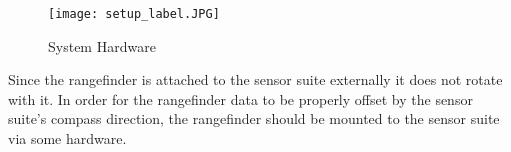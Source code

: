 \par\null\par
\begin{figure}[H]  
 	\centerline{
	\texttt{[image: setup\_label.JPG]}
	}
	\caption{System Hardware}
	\label{finalHW}
\end{figure}

Since the rangefinder is attached to the sensor suite externally it does not rotate with it. In order for the rangefinder data to be properly offset by the sensor suite's compass direction, the rangefinder should be mounted to the sensor suite via some hardware.



